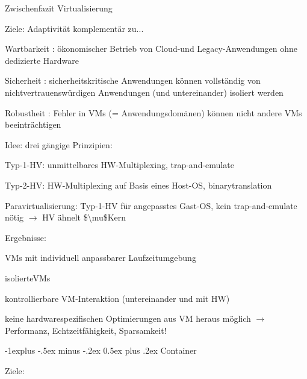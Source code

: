 \documentclass[a4paper]{article}
\makeatletter
\newcommand{\cmark}{\ding{51}}
\newcommand{\xmark}{\ding{55}}
\renewcommand{\subsection}{\@startsection{subsection}{2}{0mm}%
 {-1explus -.5ex minus -.2ex}%
 {0.5ex plus .2ex}%
 {\normalfont\normalsize\bfseries}}
\makeatother
\begin{document}
\begin{multicols}{3}
    Zwischenfazit Virtualisierung

    \begin{itemize*}
        \item
        Ziele: Adaptivität komplementär zu...
        \begin{itemize*}
            \item Wartbarkeit : ökonomischer Betrieb von Cloud-und Legacy-Anwendungen ohne dedizierte Hardware
            \item Sicherheit : sicherheitskritische Anwendungen können vollständig von nichtvertrauenswürdigen Anwendungen (und untereinander) isoliert werden
            \item Robustheit : Fehler in VMs (= Anwendungsdomänen) können nicht andere VMs beeinträchtigen
        \end{itemize*}
        \item
        Idee: drei gängige Prinzipien:
        \begin{itemize*}
            \item Typ-1-HV: unmittelbares HW-Multiplexing, trap-and-emulate
            \item Typ-2-HV: HW-Multiplexing auf Basis eines Host-OS, binarytranslation
            \item Paravirtualisierung: Typ-1-HV für angepasstes Gast-OS, kein trap-and-emulate nötig $\rightarrow$  HV ähnelt \$\textbackslash mu\$Kern
        \end{itemize*}
        \item
        Ergebnisse:
        \begin{itemize*}
            \item \cmark  VMs mit individuell anpassbarer Laufzeitumgebung
            \item \cmark  isolierteVMs
            \item \cmark  kontrollierbare VM-Interaktion (untereinander und mit HW)
            \item \xmark  keine hardwarespezifischen Optimierungen aus VM heraus möglich $\rightarrow$  Performanz, Echtzeitfähigkeit, Sparsamkeit!
        \end{itemize*}
    \end{itemize*}


    \subsection{Container}

    Ziele:


\end{multicols}
\end{document}
